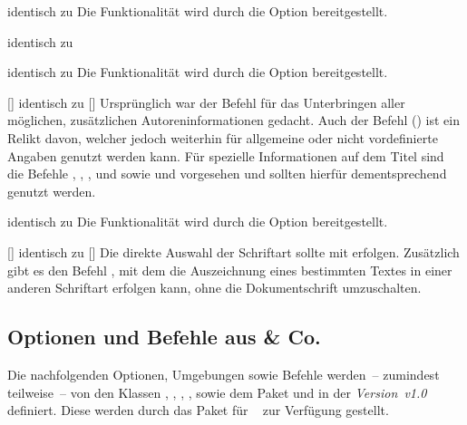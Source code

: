 \begin{DeclareEntity}{}
\begin{Declaration}{}{%
  identisch zu %
}
\printdeclarationlist%
%
Die Funktionalität wird durch die Option  bereitgestellt.
\end{Declaration}

\begin{Declaration}{}{%
  identisch zu %
}
\begin{Declaration}{}{%
  identisch zu %
}
\printdeclarationlist%
%
Die Funktionalität wird durch die Option  bereitgestellt.
\end{Declaration}
\end{Declaration}

\begin{Declaration}{[]}{%
  identisch zu []%
}
\printdeclarationlist%
%
Ursprünglich war der Befehl für das Unterbringen aller möglichen, zusätzlichen 
Autoreninformationen gedacht. Auch der Befehl () ist ein 
Relikt davon, welcher jedoch weiterhin für allgemeine oder nicht vordefinierte 
Angaben genutzt werden kann. Für spezielle Informationen auf dem Titel sind die 
Befehle , , , 
 und  sowie 
 und  vorgesehen und sollten hierfür 
dementsprechend genutzt werden.
\end{Declaration}

\begin{Declaration}{}{%
  identisch zu %
}
\printdeclarationlist%
%
Die Funktionalität wird durch die Option  bereitgestellt.
\end{Declaration}

\begin{Declaration}{[]}{%
  identisch zu []%
}
\printdeclarationlist%
%
Die direkte Auswahl der Schriftart sollte mit  erfolgen. 
Zusätzlich gibt es den Befehl , mit dem die Auszeichnung 
eines bestimmten Textes in einer anderen Schriftart erfolgen kann, ohne die 
Dokumentschrift umzuschalten.
\end{Declaration}
%


\subsection{Optionen und Befehle aus  \& Co.}
%
Die nachfolgenden Optionen, Umgebungen sowie Befehle werden~-- zumindest 
teilweise~-- von den Klassen , , 
, ,  sowie dem Paket 
 und \TUDScript in der \emph{Version~v1.0} definiert. Diese 
werden durch das Paket  für \TUDScript~\vTUDScript{} zur 
Verfügung gestellt.


\end{DeclareEntity}
